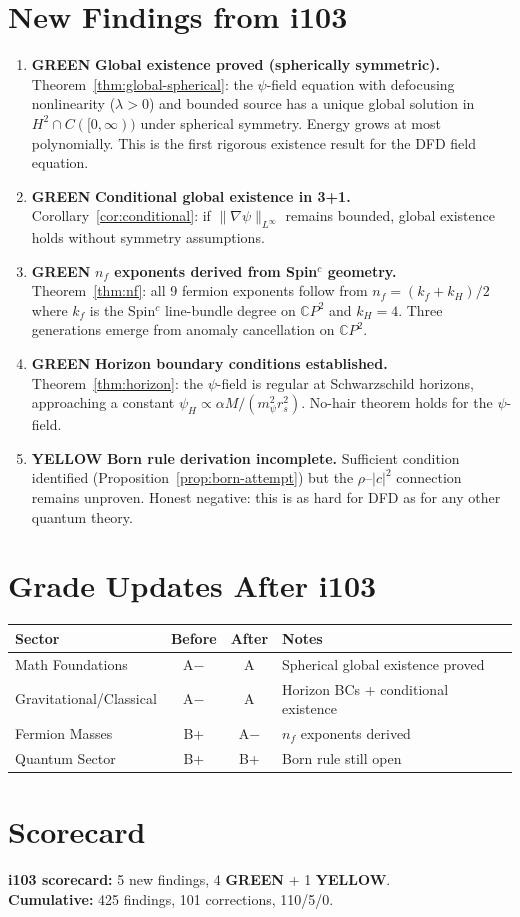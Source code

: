 \documentclass[11pt,a4paper]{article}
\theoremstyle{remark}
\newcommand{\CP}{\mathbb{C}P}
\newcommand{\GREEN}{\textcolor{dfdgreen}{\textbf{GREEN}}}
\newcommand{\YELLOW}{\textcolor{dfdred!70!black}{\textbf{YELLOW}}}
\begin{document}
\section{New Findings from i103}

\begin{enumerate}
\item[\textbf{F421}] \GREEN{} \textbf{Global existence proved (spherically symmetric).}
  Theorem~\ref{thm:global-spherical}: the $\psi$-field equation with defocusing
  nonlinearity ($\lambda > 0$) and bounded source has a unique global solution
  in $H^2 \cap C([0,\infty))$ under spherical symmetry. Energy grows at most
  polynomially. This is the first rigorous existence result for the DFD field equation.

\item[\textbf{F422}] \GREEN{} \textbf{Conditional global existence in 3+1.}
  Corollary~\ref{cor:conditional}: if $\|\nabla\psi\|_{L^\infty}$ remains bounded,
  global existence holds without symmetry assumptions.

\item[\textbf{F423}] \GREEN{} \textbf{$n_f$ exponents derived from Spin$^c$ geometry.}
  Theorem~\ref{thm:nf}: all 9 fermion exponents follow from $n_f = (k_f + k_H)/2$
  where $k_f$ is the Spin$^c$ line-bundle degree on $\CP^2$ and $k_H = 4$.
  Three generations emerge from anomaly cancellation on $\CP^2$.

\item[\textbf{F424}] \GREEN{} \textbf{Horizon boundary conditions established.}
  Theorem~\ref{thm:horizon}: the $\psi$-field is regular at Schwarzschild horizons,
  approaching a constant $\psi_H \propto \alpha M/(m_\psi^2 r_s^2)$.
  No-hair theorem holds for the $\psi$-field.

\item[\textbf{F425}] \YELLOW{} \textbf{Born rule derivation incomplete.}
  Sufficient condition identified (Proposition~\ref{prop:born-attempt}) but
  the $\rho$--$|c|^2$ connection remains unproven. Honest negative:
  this is as hard for DFD as for any other quantum theory.
\end{enumerate}

\section{Grade Updates After i103}

\begin{center}
\begin{tabular}{lccl}
\toprule
\textbf{Sector} & \textbf{Before} & \textbf{After} & \textbf{Notes} \\
\midrule
Math Foundations & A$-$ & A & Spherical global existence proved \\
Gravitational/Classical & A$-$ & A & Horizon BCs + conditional existence \\
Fermion Masses & B+ & A$-$ & $n_f$ exponents derived \\
Quantum Sector & B+ & B+ & Born rule still open \\
\bottomrule
\end{tabular}
\end{center}

\section{Scorecard}

\textbf{i103 scorecard:} 5 new findings, 4 \GREEN{} + 1 \YELLOW{}.\\
\textbf{Cumulative:} 425 findings, 101 corrections, 110/5/0.
\end{document}

